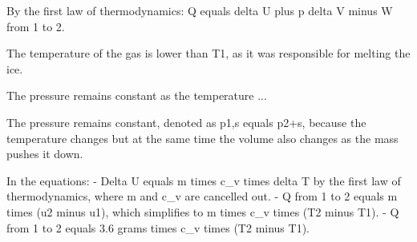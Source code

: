 By the first law of thermodynamics: Q equals delta U plus p delta V minus W from 1 to 2.

The temperature of the gas is lower than T1, as it was responsible for melting the ice.

The pressure remains constant as the temperature ...

The pressure remains constant, denoted as p1,s equals p2+s, because the temperature changes but at the same time the volume also changes as the mass pushes it down.

In the equations:
- Delta U equals m times c_v times delta T by the first law of thermodynamics, where m and c_v are cancelled out.
- Q from 1 to 2 equals m times (u2 minus u1), which simplifies to m times c_v times (T2 minus T1).
- Q from 1 to 2 equals 3.6 grams times c_v times (T2 minus T1).